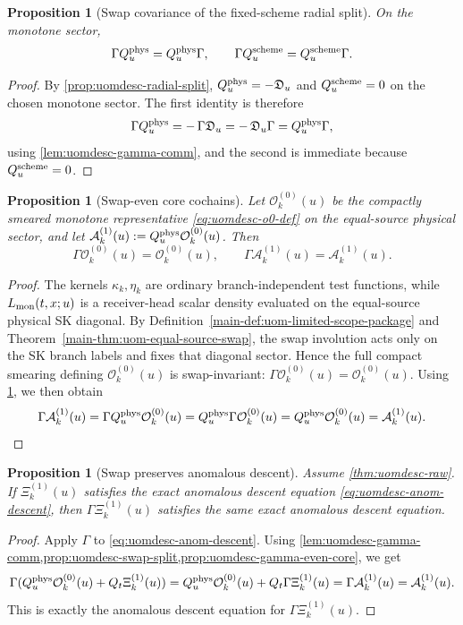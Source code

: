 \documentclass[11pt]{article}
\theoremstyle{definition}
\theoremstyle{plain}
\newtheorem{proposition}[definition]{Proposition}
\theoremstyle{remark}
\newcommand{\Ozero}{\mathcal O^{(0)}}
\newcommand{\Aone}{\mathcal A^{(1)}}
\newcommand{\Xione}{\Xi^{(1)}}
\newcommand{\Qt}{Q_t}
\newcommand{\Du}{\mathfrak D_u}
\newcommand{\Quphys}{Q_u^{\rm phys}}
\newcommand{\Quscheme}{Q_u^{\rm scheme}}
\begin{document}
\begin{proposition}[Swap covariance of the fixed-scheme radial split]
\label{prop:uomdesc-swap-split}
On the monotone sector,
\[
\Gamma\Quphys=\Quphys\Gamma,
\qquad
\Gamma\Quscheme=\Quscheme\Gamma.
\]
\end{proposition}

\begin{proof}
By \cref{prop:uomdesc-radial-split}, \(\Quphys=-\Du\) and \(\Quscheme=0\) on the chosen monotone
sector.
The first identity is therefore
\[
\Gamma\Quphys
=
-\,\Gamma\Du
=
-\,\Du\Gamma
=
\Quphys\Gamma,
\]
using \cref{lem:uomdesc-gamma-comm}, and the second is immediate because \(\Quscheme=0\).
\end{proof}

\begin{proposition}[Swap-even core cochains]
\label{prop:uomdesc-gamma-even-core}
Let \(\Ozero_k(u)\) be the compactly smeared monotone representative \eqref{eq:uomdesc-o0-def} on
the equal-source physical sector, and let \(\Aone_k(u):=\Quphys\Ozero_k(u)\).
Then
\[
\Gamma\Ozero_k(u)=\Ozero_k(u),
\qquad
\Gamma\Aone_k(u)=\Aone_k(u).
\]
\end{proposition}

\begin{proof}
The kernels \(\kappa_k,\eta_k\) are ordinary branch-independent test functions, while
\(L_{\rm mon}(t,x;u)\) is a receiver-head scalar density evaluated on the equal-source physical SK
diagonal.
By Definition~\ref{main-def:uom-limited-scope-package} and
Theorem~\ref{main-thm:uom-equal-source-swap}, the swap involution acts only on the SK branch labels
and fixes that diagonal sector.
Hence the full compact smearing defining \(\Ozero_k(u)\) is swap-invariant:
\(\Gamma\Ozero_k(u)=\Ozero_k(u)\).
Using \cref{prop:uomdesc-swap-split}, we then obtain
\[
\Gamma\Aone_k(u)
=
\Gamma\Quphys\Ozero_k(u)
=
\Quphys\Gamma\Ozero_k(u)
=
\Quphys\Ozero_k(u)
=
\Aone_k(u).
\]
\end{proof}

\begin{proposition}[Swap preserves anomalous descent]
\label{prop:uomdesc-gamma-descent}
Assume \cref{thm:uomdesc-raw}.
If \(\Xione_k(u)\) satisfies the exact anomalous descent equation
\eqref{eq:uomdesc-anom-descent}, then \(\Gamma\Xione_k(u)\) satisfies the same exact anomalous
descent equation.
\end{proposition}

\begin{proof}
Apply \(\Gamma\) to \eqref{eq:uomdesc-anom-descent}.
Using \cref{lem:uomdesc-gamma-comm,prop:uomdesc-swap-split,prop:uomdesc-gamma-even-core}, we get
\[
\Gamma(\Quphys\Ozero_k(u)+\Qt\Xione_k(u))
=
\Quphys\Ozero_k(u)+\Qt\Gamma\Xione_k(u)
=
\Gamma\Aone_k(u)
=
\Aone_k(u).
\]
This is exactly the anomalous descent equation for \(\Gamma\Xione_k(u)\).
\end{proof}
\end{document}
